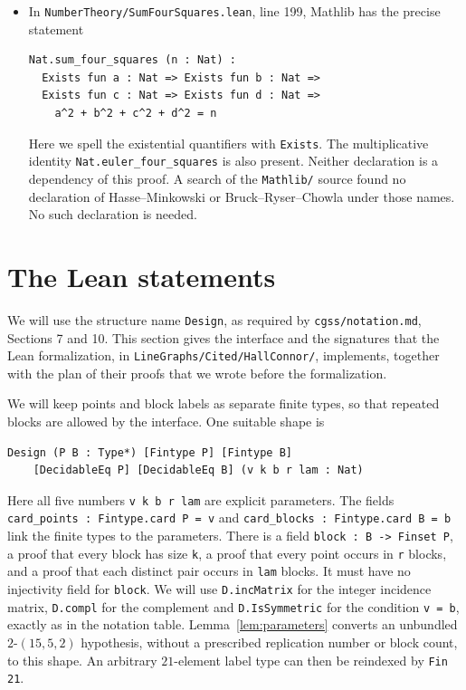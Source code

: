 \documentclass[11pt]{article}
\theoremstyle{definition}
\newcommand{\code}[1]{{\small\nolinkurl{#1}}}
\begin{document}
\begin{itemize}
\item In \code{NumberTheory/SumFourSquares.lean}, line 199, Mathlib has
the precise statement
\begin{lstlisting}
Nat.sum_four_squares (n : Nat) :
  Exists fun a : Nat => Exists fun b : Nat =>
  Exists fun c : Nat => Exists fun d : Nat =>
    a^2 + b^2 + c^2 + d^2 = n
\end{lstlisting}
Here we spell the existential quantifiers with \code{Exists}.
The multiplicative identity
\code{Nat.euler_four_squares} is also present.
Neither declaration is a dependency of this proof. A search of the
\code{Mathlib/} source found no declaration of
Hasse--Minkowski or Bruck--Ryser--Chowla under those names. No such
declaration is needed.
\end{itemize}
\endgroup

\section{The Lean statements}\label{sec:Lean}

We will use the structure name \code{Design}, as required by
\code{cgss/notation.md}, Sections 7 and 10. This section gives the
interface and the signatures that the Lean formalization, in
\code{LineGraphs/Cited/HallConnor/}, implements, together with the plan
of their proofs that we wrote before the formalization.

We will keep points and block labels as separate finite types, so
that repeated blocks are allowed by the interface. One suitable
shape is
\begin{lstlisting}
Design (P B : Type*) [Fintype P] [Fintype B]
    [DecidableEq P] [DecidableEq B] (v k b r lam : Nat)
\end{lstlisting}
Here all five numbers \code{v k b r lam} are explicit parameters.
The fields \code{card_points : Fintype.card P = v} and
\code{card_blocks : Fintype.card B = b} link the finite types to the
parameters. There is a field \code{block : B -> Finset P}, a proof that every block
has size \code{k}, a proof that every point occurs in \code{r}
blocks, and a proof that each distinct pair occurs in \code{lam}
blocks. It must have no injectivity field for \code{block}.
We will use \code{D.incMatrix} for the integer incidence matrix,
\code{D.compl} for the complement and \code{D.IsSymmetric} for the
condition \code{v = b}, exactly as in the notation table.
Lemma~\ref{lem:parameters} converts an unbundled
$2$-$(15,5,2)$ hypothesis, without a prescribed replication number or
block count, to this shape. An arbitrary $21$-element label type can
then be reindexed by \code{Fin 21}.
\end{document}
